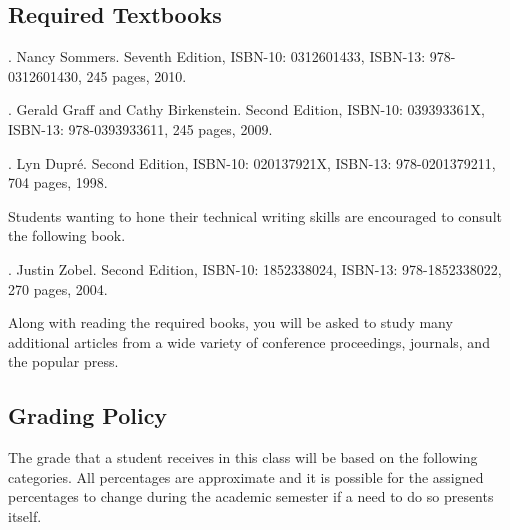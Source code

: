 \subsection*{Required Textbooks}


  . Nancy Sommers. Seventh Edition,  ISBN-10: 0312601433, ISBN-13: 978-0312601430,
  245 pages, 2010.


  . Gerald Graff and Cathy Birkenstein. Second Edition,  
  ISBN-10: 039393361X, ISBN-13: 978-0393933611, 245 pages, 2009.


. Lyn Dupr\'e. Second Edition,  ISBN-10: 020137921X,
ISBN-13: 978-0201379211, 704 pages, 1998.

\noindent
Students wanting to hone their technical writing skills are encouraged to consult the following book.

.  Justin Zobel. Second Edition,  ISBN-10: 1852338024, ISBN-13:
978-1852338022, 270 pages, 2004.

\noindent 
Along with reading the required books, you will be asked to study many additional articles from a wide variety of
conference proceedings, journals, and the popular press.


\subsection*{Grading Policy}

The grade that a student receives in this class will be based on the
following categories. All percentages are approximate and it is possible
for the assigned percentages to change during the academic semester if a
need to do so presents itself. 

